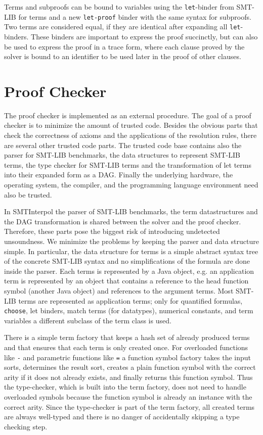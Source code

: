 \documentclass[a4paper]{easychair}
\newcommand\SI{SMTInterpol\xspace}
\newcommand\smtlib[1]{\texttt{#1}}
\begin{document}
Terms and subproofs can be bound to variables using the \smtlib{let}-binder from SMT-LIB for terms and a new \smtlib{let-proof} binder with the same syntax for subproofs.
Two terms are considered equal, if they are identical after expanding all \smtlib{let}-binders.
These binders are important to express the proof succinctly, but can also be used to express the proof in a trace form, where each clause proved by the solver is bound to an identifier to be used later in the proof of other clauses.


\section*{Proof Checker}

The proof checker is implemented as an external procedure.
The goal of a proof checker is to minimize the amount of trusted code.
Besides the obvious parts that check the correctness of axioms and the applications of the resolution rules, there are several other trusted code parts.
The trusted code base contains also the parser for SMT-LIB benchmarks,
the data structures to represent SMT-LIB terms,
the type checker for SMT-LIB terms and the transformation of let terms into their expanded form as a DAG.
Finally the underlying hardware, the operating system, the compiler, and the programming language environment need also be trusted.

In \SI the parser of SMT-LIB benchmarks, the term datastructures and the DAG transformation is shared between the solver and the proof checker.
Therefore, these parts pose the biggest risk of introducing undetected unsoundness.
We minimize the problems by keeping the parser and data structure simple.
In particular, the data structure for terms is a simple abstract syntax tree of the concrete SMT-LIB syntax and no simplifications of the formula are done inside the parser.
Each terms is represented by a Java object, e.g. an application term is represented by an object that contains a reference to the head function symbol (another Java object) and references to the argument terms.
Most SMT-LIB terms are represented as application terms; only for quantified formulas, \smtlib{choose}, let binders, match terms (for datatypes), numerical constants, and term variables a different subclass of the term class is used.

There is a simple term factory that keeps a hash set of already produced terms and that ensures that each term is only created once.
For overloaded functions like \smtlib{-} and parametric functions like \smtlib{=} a function symbol factory takes the input sorts, determines the result sort, creates a plain function symbol with the correct arity if it does not already exists, and finally returns this function symbol.
Thus the type-checker, which is built into the term factory, does not need to handle overloaded symbols because the function symbol is already an instance with the correct arity.
Since the type-checker is part of the term factory, all created terms are always well-typed and there is no danger of accidentally skipping a type checking step.
\end{document}
